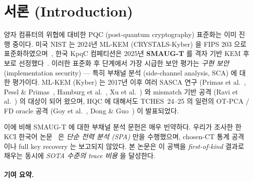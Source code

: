 \documentclass[11pt]{article}
\theoremstyle{plain}
\theoremstyle{definition}
\theoremstyle{remark}
\begin{document}
\section{서론 (Introduction)}
\label{sec:intro}

양자 컴퓨터의 위협에 대비한 PQC (post-quantum cryptography) 표준화는
이미 진행 중이다. 미국 NIST 는 2024년 ML-KEM (CRYSTALS-Kyber) 을
FIPS 203 으로 표준화하였으며~\citep{nist-fips203}, 한국 KpqC 컴페티션은
2025년 \textbf{SMAUG-T} 를 격자 기반 KEM 후보로 선정했다~\citep{smaugt-v4}.
이러한 표준화 후 단계에서 가장 시급한 보안 평가는 \emph{구현 보안} (implementation
security) — 특히 부채널 분석 (side-channel analysis, SCA) 에 대한 평가이다.
ML-KEM (Kyber) 는 2017년 이후 여러 SASCA 연구 (Primas et al.~\citep{primas17},
Pessl \& Primas~\citep{pessl19}, Hamburg et al.~\citep{hamburg21},
Xu et al.~\citep{xu21}) 와 mismatch 기반 공격 (Ravi et al.~\citep{ravi20})
의 대상이 되어 왔으며, HQC 에 대해서도 TCHES~24--25 의 일련의 OT-PCA / FD
oracle 공격 (Goy et al.~\citep{goy24}, Dong \& Guo~\citep{donggu025otpca,
donggu025mvfd}) 이 발표되었다.

이에 비해 SMAUG-T 에 대한 부채널 분석 문헌은 매우 빈약하다. 우리가 조사한 한
KCI 한국어 논문~\citep{smaugt-spa-kci} 은 \emph{단순 전력 분석 (SPA)} 만을
수행했으며, chosen-CT 통계 공격이나 full key recovery 는 보고되지 않았다.
본 논문은 이 공백을 \emph{first-of-kind} 결과로 채우는 동시에 \emph{SOTA
수준의 trace 비용} 을 달성한다.

\paragraph{기여 요약.}
\end{document}
